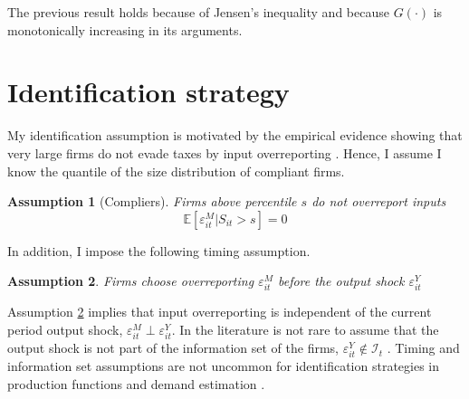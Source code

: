 \documentclass[
  12pt]{article}
\newtheorem{ass}{Assumption}
\theoremstyle{definition}
\theoremstyle{remark}
\begin{document}
The previous result holds because of Jensen's inequality and because
\(G(\cdot)\) is monotonically increasing in its arguments.

\hypertarget{identification-strategy}{%
\section{Identification strategy}\label{identification-strategy}}

My identification assumption is motivated by the empirical evidence
showing that very large firms do not evade taxes by input overreporting
\citep{Carrillo2022}. Hence, I assume I know the quantile of the size
distribution of compliant firms.

\begin{tcolorbox}[enhanced jigsaw, breakable, bottomrule=.15mm, opacityback=0, left=2mm, arc=.35mm, rightrule=.15mm, toprule=.15mm, leftrule=.75mm, colframe=quarto-callout-color-frame, colback=white]

\begin{ass}[Compliers]\label{ass-comp}
Firms above percentile $s$ do not overreport inputs $$\mathbb{E}[\varepsilon^M_{it}|S_{it}>s]=0$$
\end{ass}

\end{tcolorbox}

In addition, I impose the following timing assumption.

\begin{tcolorbox}[enhanced jigsaw, breakable, bottomrule=.15mm, opacityback=0, left=2mm, arc=.35mm, rightrule=.15mm, toprule=.15mm, leftrule=.75mm, colframe=quarto-callout-color-frame, colback=white]

\begin{ass}\label{ass-ind}
Firms choose overreporting $\varepsilon^M_{it}$ \emph{before} the output shock $\varepsilon^Y_{it}$
\end{ass}

\end{tcolorbox}

Assumption \ref{ass-ind} implies that input overreporting is independent
of the current period output shock,
\(\varepsilon^M_{it} \perp \varepsilon^Y_{it}\). In the literature is
not rare to assume that the output shock is not part of the information
set of the firms, \(\varepsilon^Y_{it}\not\in \mathcal{I}_t\)
\citep{Gandhi2020}. Timing and information set assumptions are not
uncommon for identification strategies in production functions and
demand estimation \citep{Ackerberg2021, Ackerberg2019}.
\end{document}
